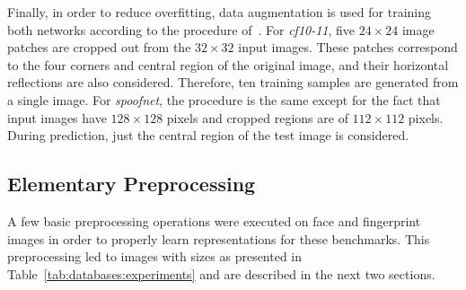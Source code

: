 

Finally, in order to reduce overfitting, data augmentation is used for training both networks according to the procedure of~\cite{Krizhevsky:2012}. For \emph{cf10-11}, five $24\times24$ image patches are cropped out from the $32\times32$ input images. These patches correspond to the four corners and central region of the original image, and their horizontal reflections are also considered. Therefore, ten training samples are generated from a single image. For \emph{spoofnet}, the procedure is the same except for the fact that input images have $128\times128$ pixels and cropped regions are of $112\times112$ pixels. During prediction, just the central region of the test image is considered.


\subsection{Elementary Preprocessing}
\label{sec:preproc}

A few basic preprocessing operations were executed on face and fingerprint images in order to properly learn representations for these benchmarks. 
This preprocessing led to images with sizes as presented in Table~\ref{tab:databases:experiments} and are described in the next two sections.

